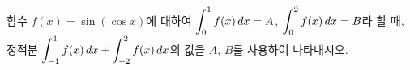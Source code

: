 함수 $f(x)=\sin(\cos x)$에 대하여 $\displaystyle\int_{0}^{1}f(x)\mkern3mu dx=A$, $\displaystyle\int_{0}^{2}f(x)\mkern3mu dx=B$라 할 때, 정적분 $\displaystyle\int_{-1}^{1}f(x)\mkern3mu dx+\int_{-2}^{2}f(x)\mkern3mu dx$의 값을 $A$, $B$를 사용하여 나타내시오.
